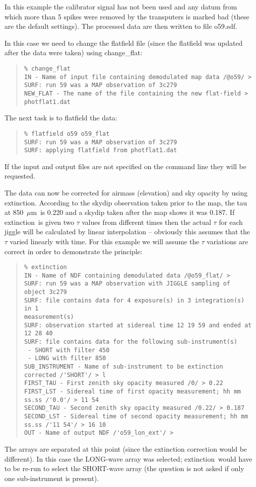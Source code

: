 \documentclass[twoside,11pt]{article}
\newcommand{\micron}           {$\mu$m}
\newcommand{\task}[1]{{\sf #1}}
\newcommand{\chgflat}{\htmlref{\task{change\_flat}}{CHANGE_FLAT}}
\newcommand{\ext}{\htmlref{\task{extinction}}{EXTINCTION}}
\newenvironment{myquote}{\begin{quote}\begin{small}}{\end{small}\end{quote}}
\newcommand{\htmlref}[2]{#1}
\begin{document}
In this example the calibrator signal has not been used and any datum from
which more than 5 spikes were removed by the transputers is marked bad (these
are the default settings). The processed data are then written to file
o59.sdf.

In this case we need to change the flatfield file (since the flatfield was
updated after the data were taken) using \chgflat:
\begin{myquote}
\begin{verbatim}
% change_flat
IN - Name of input file containing demodulated map data /@o59/ > 
SURF: run 59 was a MAP observation of 3c279
NEW_FLAT - The name of the file containing the new flat-field > photflat1.dat
\end{verbatim}
\end{myquote}

The next task is to flatfield the data:
\begin{myquote}
\begin{verbatim}
% flatfield o59 o59_flat
SURF: run 59 was a MAP observation of 3c279
SURF: applying flatfield from photflat1.dat
\end{verbatim}
\end{myquote}

If the input and output files are not specified on the command line they will
be requested.

The data can now be corrected for airmass (elevation) and sky opacity by using
\ext. According to the skydip observation taken prior to the map, the tau at
850~\micron\ is 0.220 and a skydip taken after the map shows it was 0.187. If
\ext\ is given two $\tau$ values from different times then the actual $\tau$
for each jiggle will be calculated by linear interpolation -- obviously this
assumes that the $\tau$ varied linearly with time. For this example we will
assume the $\tau$ variations are correct in order to demonstrate the principle:

\begin{myquote}
\begin{verbatim}
% extinction
IN - Name of NDF containing demodulated data /@o59_flat/ > 
SURF: run 59 was a MAP observation with JIGGLE sampling of object 3c279
SURF: file contains data for 4 exposure(s) in 3 integration(s) in 1
measurement(s)
SURF: observation started at sidereal time 12 19 59 and ended at 12 28 40
SURF: file contains data for the following sub-instrument(s)
 - SHORT with filter 450
 - LONG with filter 850
SUB_INSTRUMENT - Name of sub-instrument to be extinction corrected /'SHORT'/ > l
FIRST_TAU - First zenith sky opacity measured /0/ > 0.22
FIRST_LST - Sidereal time of first opacity measurement; hh mm ss.ss /'0.0'/ > 11 54
SECOND_TAU - Second zenith sky opacity measured /0.22/ > 0.187
SECOND_LST - Sidereal time of second opacity measurement; hh mm ss.ss /'11 54'/ > 16 10
OUT - Name of output NDF /'o59_lon_ext'/ > 
\end{verbatim}
\end{myquote}
The arrays are separated at this point (since the extinction correction would
be different). In this case the LONG-wave array was selected; \ext\
would have to be re-run to select the SHORT-wave array (the question is not
asked if only one sub-instrument is present). 
\end{document}
